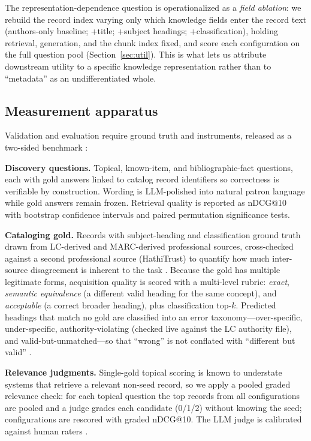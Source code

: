 The representation-dependence question is operationalized as a
\emph{field ablation}: we rebuild the record index varying only which
knowledge fields enter the record text (authors-only baseline; +title;
+subject headings; +classification), holding retrieval, generation, and the
chunk index fixed, and score each configuration on the full question pool
(Section~\ref{sec:util}). This is what lets us attribute downstream utility
to a specific knowledge representation rather than to ``metadata'' as an
undifferentiated whole.

\subsection{Measurement apparatus}
\label{sec:method:benchmark}

Validation and evaluation require ground truth and instruments, released as
a two-sided benchmark :

\textbf{Discovery questions.} Topical, known-item, and bibliographic-fact
questions, each with gold answers linked to catalog record identifiers so
correctness is verifiable by construction. Wording is LLM-polished into
natural patron language while gold answers remain frozen. Retrieval quality
is reported as nDCG@10~\cite{ndcg} with bootstrap confidence intervals and
paired permutation significance tests.

\textbf{Cataloging gold.} Records with subject-heading and classification
ground truth drawn from LC-derived and MARC-derived professional sources,
cross-checked against a second professional source (HathiTrust) to quantify
how much inter-source disagreement is inherent to the task
. Because the
gold has multiple legitimate forms, acquisition quality is scored with a
multi-level rubric: \emph{exact}, \emph{semantic equivalence} (a different
valid heading for the same concept), and \emph{acceptable} (a correct
broader heading), plus classification top-$k$. Predicted headings that match
no gold are classified into an error taxonomy---over-specific,
under-specific, authority-violating (checked live against the LC authority
file), and valid-but-unmatched---so that ``wrong'' is not conflated with
``different but valid'' .

\textbf{Relevance judgments.} Single-gold topical scoring is known to
understate systems that retrieve a relevant non-seed record, so we apply a
pooled graded relevance check: for each topical question the top records
from all configurations are pooled and a judge grades each candidate
(0/1/2) without knowing the seed; configurations are rescored with graded
nDCG@10. The LLM judge is calibrated against human raters
.

